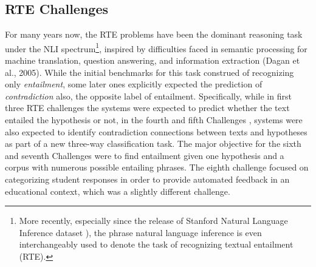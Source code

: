 \subsection{RTE Challenges}
\label{rte_datasets}



For many years now, the RTE problems have been the dominant reasoning task under the NLI spectrum\footnote{More recently, especially since the release of Stanford Natural Language Inference dataset \citep{bowman2015large}), the phrase natural language inference is even interchangeably used to denote the task of recognizing textual entailment (RTE).}, inspired by difficulties faced in semantic processing for machine translation, question answering, and information extraction (Dagan et al., 2005). While the initial benchmarks for this task construed of recognizing only \textit{entailment}, some later ones explicitly expected the prediction of \textit{contradiction} also, the opposite label of entailment. Specifically, while in first three RTE challenges \citep{dagan2010recognizing,haim2006second,giampiccolo2007third} the systems were expected to predict whether the text entailed the hypothesis or not, in the fourth and fifth Challenges \citep{bentivogli2009fifth,giampiccolo2008fourth}, systems were also expected to identify contradiction connections between texts and hypotheses as part of a new three-way classification task.
The major objective for the sixth and seventh Challenges \citep{bentivogli2011seventh} were to find entailment given one hypothesis and a corpus with numerous possible entailing phrases.
The eighth challenge \citep{dzikovska2013semeval} focused on categorizing student responses in order to provide automated feedback in an educational context, which was a slightly different challenge.

